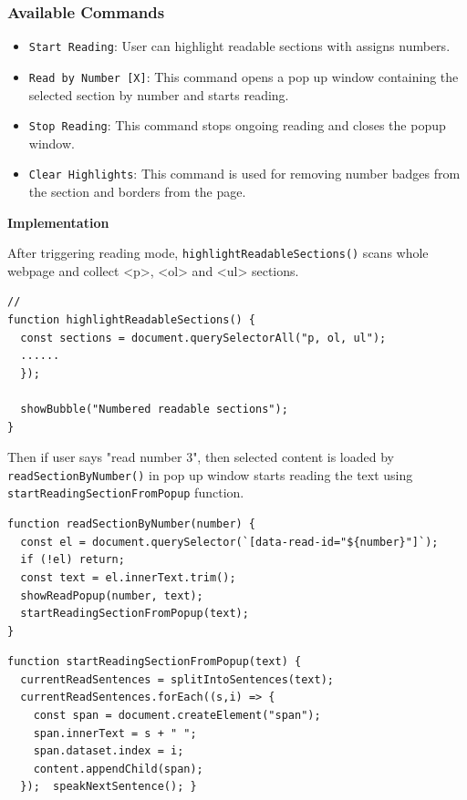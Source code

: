 \subsubsection*{Available Commands}
\begin{itemize}
    \item \texttt{Start Reading}: User can highlight readable sections with assigns numbers.  
    \item \texttt{Read by Number [X]}: This command opens a pop up window containing the selected section by number and starts reading.
    \item \texttt{Stop Reading}: This command stops ongoing reading and closes the popup window.  
    \item \texttt{Clear Highlights}: This command is used for removing number badges from the section and borders from the page.  
\end{itemize}

\textbf{Implementation}

After triggering reading mode, \texttt{highlightReadableSections()} scans whole webpage and collect <p>, <ol> and <ul> sections.
\begin{verbatim}
//
function highlightReadableSections() {
  const sections = document.querySelectorAll("p, ol, ul");
  ......
  });

  showBubble("Numbered readable sections");
}
\end{verbatim}

Then if user says "read number 3", then selected content is loaded by \texttt{readSectionByNumber()} 
 in pop up window starts reading the text using \texttt{startReadingSectionFromPopup} function.

\begin{verbatim}
function readSectionByNumber(number) {
  const el = document.querySelector(`[data-read-id="${number}"]`);
  if (!el) return;
  const text = el.innerText.trim();
  showReadPopup(number, text); 
  startReadingSectionFromPopup(text); 
}
\end{verbatim}

\vspace{1in}

\begin{verbatim}
function startReadingSectionFromPopup(text) {
  currentReadSentences = splitIntoSentences(text);
  currentReadSentences.forEach((s,i) => {
    const span = document.createElement("span");
    span.innerText = s + " ";
    span.dataset.index = i;
    content.appendChild(span);
  });  speakNextSentence(); }
\end{verbatim}


